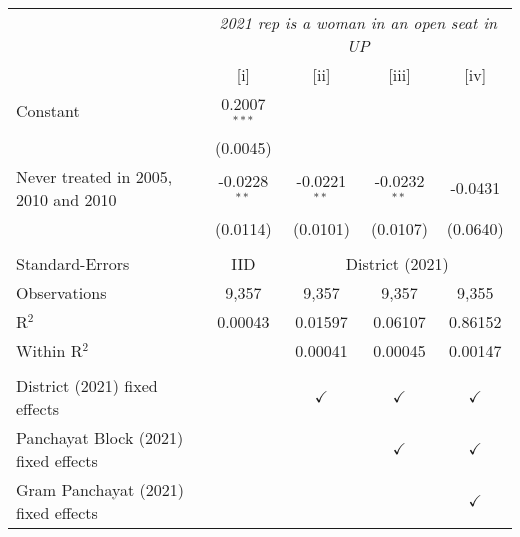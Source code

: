 
\begingroup
\centering
\begin{tabular}{lcccc}
   \toprule
    & \multicolumn{4}{c}{\textit{2021 rep is a woman in an open seat in UP}}\\
                                        & [i]            & [ii]           & [iii]          & [iv]\\  
   \midrule 
   Constant                             & 0.2007$^{***}$ &                &                &   \\   
                                        & (0.0045)       &                &                &   \\   
   Never treated in 2005, 2010 and 2010 & -0.0228$^{**}$ & -0.0221$^{**}$ & -0.0232$^{**}$ & -0.0431\\   
                                        & (0.0114)       & (0.0101)       & (0.0107)       & (0.0640)\\   
    \\
   Standard-Errors & IID & \multicolumn{3}{c}{District (2021)} \\ 
   Observations                         & 9,357          & 9,357          & 9,357          & 9,355\\  
   R$^2$                                & 0.00043        & 0.01597        & 0.06107        & 0.86152\\  
   Within R$^2$                         &                & 0.00041        & 0.00045        & 0.00147\\  
    \\
   District (2021) fixed effects        &                & $\checkmark$   & $\checkmark$   & $\checkmark$\\   
   Panchayat Block (2021) fixed effects &                &                & $\checkmark$   & $\checkmark$\\   
   Gram Panchayat (2021) fixed effects  &                &                &                & $\checkmark$\\   
   \bottomrule
\end{tabular}
\par\endgroup


